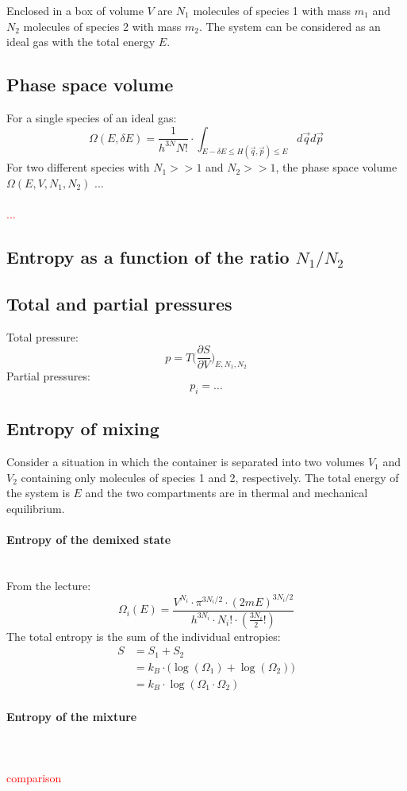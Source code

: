 Enclosed in a box of volume $V$ are $N_1$ molecules of species 1 with mass $m_1$
and $N_2$ molecules of species 2 with mass $m_2$. The system can be 
considered as an ideal gas with the total energy $E$.

\subsection{Phase space volume}
    For a single species of an ideal gas:
    \begin{equation}
        \Omega(E,\delta E)=\frac{1}{h^{3N}N!}\cdot
        \int_{E-\delta E\leq H(\vec q,\vec p)\leq E}
        d\vec q d\vec p
    \end{equation}
    For two different species with $N_1>>1$ and $N_2>>1$, 
    the phase space volume $\Omega(E,V,N_1,N_2)$ ... \\
    \\
    \textcolor{red}{...}

\subsection{Entropy as a function of the ratio $N_1/N_2$}

\subsection{Total and partial pressures}
    Total pressure:
    \begin{equation}
        p=T\bigg(\frac{\partial S}{\partial V}\bigg)_{E,N_1,N_2}
    \end{equation}
    Partial pressures:
    \begin{equation}
        p_i=...
    \end{equation}

\subsection{Entropy of mixing}
    Consider a situation in which the container is separated into two volumes 
    $V_1$ and $V_2$ containing only molecules of species 1 and 2, respectively. 
    The total energy of the system is $E$ and the two compartments are in 
    thermal and mechanical equilibrium. 

\paragraph{Entropy of the demixed state} \ \\
    From the lecture:
    \begin{equation}
        \Omega_i(E)
        =\frac{V^{N_i}\cdot\pi^{3N_i/2}\cdot(2mE)^{3N_i/2}}
        {h^{3N_i}\cdot N_i!\cdot(\frac{3N_i}{2}!)}
    \end{equation}
    The total entropy is the sum of the individual entropies:
    \begin{align}
        S&=S_1+S_2 \\
         &=k_B\cdot\bigg(\log(\Omega_1)+\log(\Omega_2)\bigg) \\
         &=k_B\cdot\log(\Omega_1\cdot\Omega_2)
    \end{align}
    
    \paragraph{Entropy of the mixture} \ \\
    \\
    \textcolor{red}{comparison}
